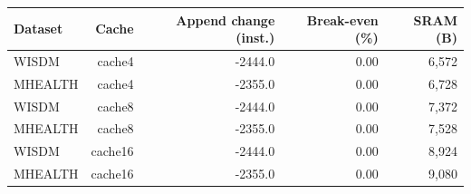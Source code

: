 \begin{tabular}{lrrrr}
\toprule
Dataset & Cache & Append change (inst.) & Break-even (\%) & SRAM (B) \\
\midrule
WISDM & cache4 & -2444.0 & 0.00 & 6,572 \\
MHEALTH & cache4 & -2355.0 & 0.00 & 6,728 \\
WISDM & cache8 & -2444.0 & 0.00 & 7,372 \\
MHEALTH & cache8 & -2355.0 & 0.00 & 7,528 \\
WISDM & cache16 & -2444.0 & 0.00 & 8,924 \\
MHEALTH & cache16 & -2355.0 & 0.00 & 9,080 \\
\bottomrule
\end{tabular}

